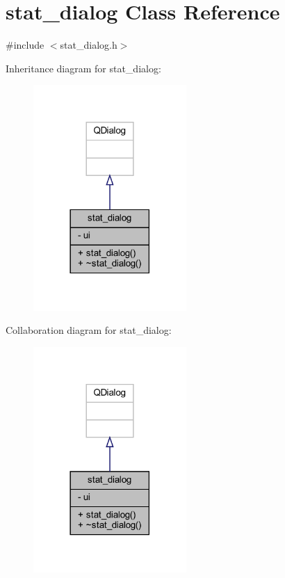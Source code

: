 \hypertarget{classstat__dialog}{}\section{stat\+\_\+dialog Class Reference}
\label{classstat__dialog}


{\ttfamily \#include $<$stat\+\_\+dialog.\+h$>$}



Inheritance diagram for stat\+\_\+dialog\+:
\nopagebreak
\begin{figure}[H]
\begin{center}
\leavevmode
\includegraphics[width=165pt]{classstat__dialog__inherit__graph}
\end{center}
\end{figure}


Collaboration diagram for stat\+\_\+dialog\+:
\nopagebreak
\begin{figure}[H]
\begin{center}
\leavevmode
\includegraphics[width=165pt]{classstat__dialog__coll__graph}
\end{center}
\end{figure}
